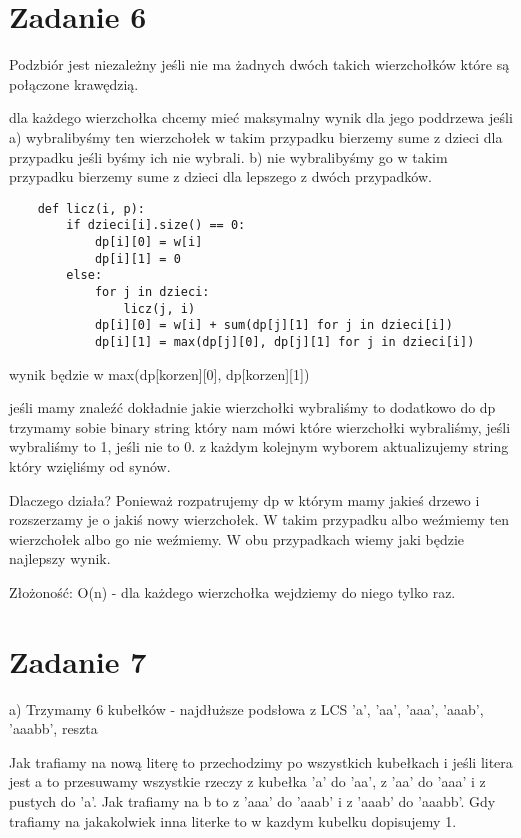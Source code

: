 \documentclass[12pt]{article}
\begin{document}
\section{Zadanie 6}
Podzbiór jest niezależny jeśli nie ma żadnych dwóch takich wierzchołków które są połączone krawędzią. 

dla każdego wierzchołka chcemy mieć maksymalny wynik dla jego poddrzewa jeśli 
a) wybralibyśmy ten wierzchołek 
w takim przypadku bierzemy sume z dzieci dla przypadku jeśli byśmy ich nie wybrali. 
b) nie wybralibyśmy go
w takim przypadku bierzemy sume z dzieci dla lepszego z dwóch przypadków. 

\begin{lstlisting}
    def licz(i, p):
        if dzieci[i].size() == 0:
            dp[i][0] = w[i]
            dp[i][1] = 0 
        else:
            for j in dzieci: 
                licz(j, i)
            dp[i][0] = w[i] + sum(dp[j][1] for j in dzieci[i])
            dp[i][1] = max(dp[j][0], dp[j][1] for j in dzieci[i])
\end{lstlisting}
wynik będzie w max(dp[korzen][0], dp[korzen][1])


jeśli mamy znaleźć dokładnie jakie wierzchołki wybraliśmy to dodatkowo do dp trzymamy sobie binary string który nam mówi które wierzchołki wybraliśmy, jeśli wybraliśmy to 1, jeśli nie to 0. z każdym kolejnym wyborem aktualizujemy string który wzięliśmy od synów.


Dlaczego działa? Ponieważ rozpatrujemy dp w którym mamy jakieś drzewo i rozszerzamy je o jakiś nowy wierzchołek. W takim przypadku albo weźmiemy ten wierzchołek albo go nie weźmiemy. W obu przypadkach wiemy jaki będzie najlepszy wynik.

Złożoność:
O(n) - dla każdego wierzchołka wejdziemy do niego tylko raz. 

\section{Zadanie 7}

a) Trzymamy 6 kubełków - najdłuższe podsłowa z LCS 'a', 'aa', 'aaa', 'aaab', 'aaabb', reszta 

Jak trafiamy na nową literę to przechodzimy po wszystkich kubełkach i jeśli litera jest a to przesuwamy wszystkie rzeczy z kubełka 'a' do 'aa', z 'aa' do 'aaa' i z pustych do 'a'. 
Jak trafiamy na b to z 'aaa' do 'aaab' i z 'aaab' do 'aaabb'.
Gdy trafiamy na jakakolwiek inna literke to w kazdym kubelku dopisujemy 1.
\end{document}
